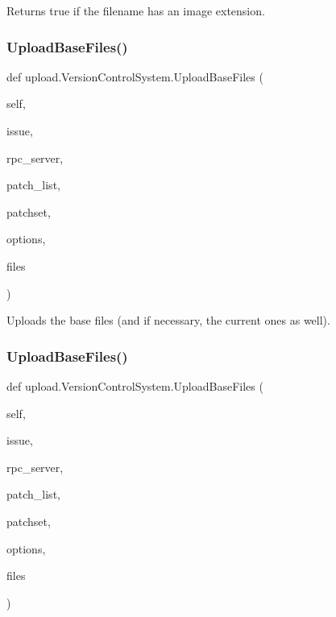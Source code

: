 \begin{DoxyVerb}Returns true if the filename has an image extension.\end{DoxyVerb}
 \mbox{\label{classupload_1_1_version_control_system_a7e334f967301b9e85e5a9c39f5036823}} 
\subsubsection{\texorpdfstring{Upload\+Base\+Files()}{UploadBaseFiles()}\hspace{0.1cm}{\footnotesize\ttfamily [1/2]}}
{\footnotesize\ttfamily def upload.\+Version\+Control\+System.\+Upload\+Base\+Files (\begin{DoxyParamCaption}\item[{}]{self,  }\item[{}]{issue,  }\item[{}]{rpc\+\_\+server,  }\item[{}]{patch\+\_\+list,  }\item[{}]{patchset,  }\item[{}]{options,  }\item[{}]{files }\end{DoxyParamCaption})}

\begin{DoxyVerb}Uploads the base files (and if necessary, the current ones as well).\end{DoxyVerb}
 \mbox{\label{classupload_1_1_version_control_system_a7e334f967301b9e85e5a9c39f5036823}} 
\subsubsection{\texorpdfstring{Upload\+Base\+Files()}{UploadBaseFiles()}\hspace{0.1cm}{\footnotesize\ttfamily [2/2]}}
{\footnotesize\ttfamily def upload.\+Version\+Control\+System.\+Upload\+Base\+Files (\begin{DoxyParamCaption}\item[{}]{self,  }\item[{}]{issue,  }\item[{}]{rpc\+\_\+server,  }\item[{}]{patch\+\_\+list,  }\item[{}]{patchset,  }\item[{}]{options,  }\item[{}]{files }\end{DoxyParamCaption})}

